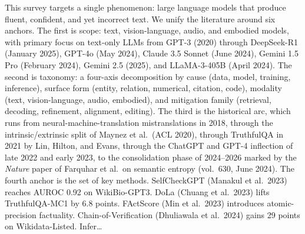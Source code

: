 This survey targets a single phenomenon: large language models that produce fluent, confident, and yet incorrect text. We unify the literature around six anchors. The first is scope: text, vision-language, audio, and embodied models, with primary focus on text-only LLMs from GPT-3 (2020) through DeepSeek-R1 (January 2025), GPT-4o (May 2024), Claude 3.5 Sonnet (June 2024), Gemini 1.5 Pro (February 2024), Gemini 2.5 (2025), and LLaMA-3-405B (April 2024). The second is taxonomy: a four-axis decomposition by cause (data, model, training, inference), surface form (entity, relation, numerical, citation, code), modality (text, vision-language, audio, embodied), and mitigation family (retrieval, decoding, refinement, alignment, editing). The third is the historical arc, which runs from neural-machine-translation mistranslations in 2018, through the intrinsic/extrinsic split of Maynez et al.~(ACL 2020), through TruthfulQA in 2021 by Lin, Hilton, and Evans, through the ChatGPT and GPT-4 inflection of late 2022 and early 2023, to the consolidation phase of 2024--2026 marked by the \emph{Nature} paper of Farquhar et al.~on semantic entropy (vol.~630, June 2024). The fourth anchor is the set of key methods. SelfCheckGPT (Manakul et al.~2023) reaches AUROC 0.92 on WikiBio-GPT3. DoLa (Chuang et al.~2023) lifts TruthfulQA-MC1 by 6.8 points. FActScore (Min et al.~2023) introduces atomic-precision factuality. Chain-of-Verification (Dhuliawala et al.~2024) gains 29 points on Wikidata-Listed. Infer\ldots{}
